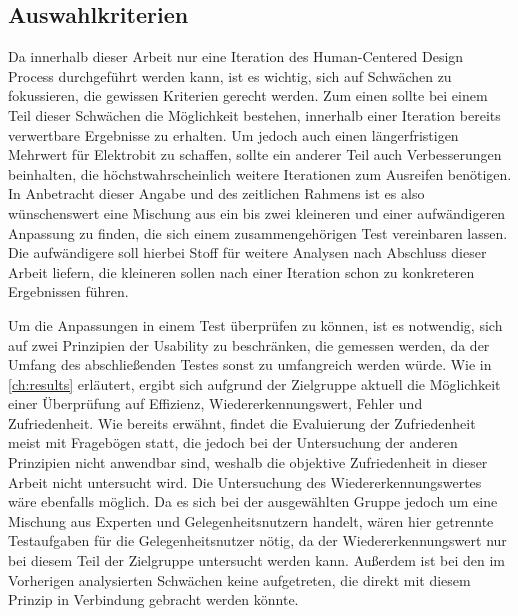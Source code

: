 \subsection{Auswahlkriterien}
Da innerhalb dieser Arbeit nur eine Iteration des Human-Centered Design Process durchgeführt werden kann, ist es wichtig, sich auf Schwächen zu fokussieren, die gewissen Kriterien gerecht werden.
Zum einen sollte bei einem Teil dieser Schwächen die Möglichkeit bestehen, innerhalb einer Iteration bereits verwertbare Ergebnisse zu erhalten.
Um jedoch auch einen längerfristigen Mehrwert für Elektrobit zu schaffen, sollte ein anderer Teil auch Verbesserungen beinhalten, die höchstwahrscheinlich weitere Iterationen zum Ausreifen benötigen.
In Anbetracht dieser Angabe und des zeitlichen Rahmens ist es also wünschenswert eine Mischung aus ein bis zwei kleineren und einer aufwändigeren Anpassung zu finden, die sich einem zusammengehörigen Test vereinbaren lassen.
Die aufwändigere soll hierbei Stoff für weitere Analysen nach Abschluss dieser Arbeit liefern, die kleineren sollen nach einer Iteration schon zu konkreteren Ergebnissen führen.

Um die Anpassungen in einem Test überprüfen zu können, ist es notwendig, sich auf zwei Prinzipien der Usability zu beschränken, die gemessen werden, da der Umfang des abschließenden Testes sonst zu umfangreich werden würde. Wie in \cref{ch:results} erläutert, ergibt sich aufgrund der Zielgruppe aktuell die Möglichkeit einer Überprüfung auf Effizienz, Wiedererkennungswert, Fehler und Zufriedenheit.
Wie bereits erwähnt, findet die Evaluierung der Zufriedenheit meist mit Fragebögen statt, die jedoch bei der Untersuchung der anderen Prinzipien nicht anwendbar sind, weshalb die objektive Zufriedenheit in dieser Arbeit nicht untersucht wird.
Die Untersuchung des Wiedererkennungswertes wäre ebenfalls möglich.
Da es sich bei der ausgewählten Gruppe jedoch um eine Mischung aus Experten und Gelegenheitsnutzern handelt, wären hier getrennte Testaufgaben für die Gelegenheitsnutzer nötig, da der Wiedererkennungswert nur bei diesem Teil der Zielgruppe untersucht werden kann.
Außerdem ist bei den im Vorherigen analysierten Schwächen keine aufgetreten, die direkt mit diesem Prinzip in Verbindung gebracht werden könnte.

